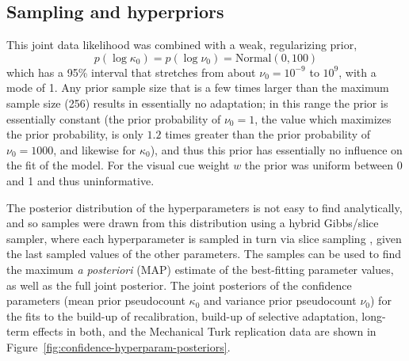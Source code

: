 \subsection{Sampling and hyperpriors}
\label{sec:sampl-hyperp-priors}

This joint data likelihood was combined with a weak, regularizing prior, 
$$p(\log \kappa_0) = p(\log \nu_0) = \mathrm{Normal}(0, 100)$$ 
which has a 95\% interval that stretches from about $\nu_0=10^{-9}$ to $10^{9}$, with a mode of 1.  Any prior sample size that is a few times larger than the maximum sample size (256) results in essentially no adaptation; in this range the prior is essentially constant (the prior probability of $\nu_0 = 1$, the value which maximizes the prior probability, is only $1.2$ times greater than the prior probability of $\nu_0=1000$, and likewise for $\kappa_0$), and thus this prior has essentially no influence on the fit of the model.  For the visual cue weight $w$ the prior was uniform between 0 and 1 and thus uninformative.

The posterior distribution of the hyperparameters is not easy to find analytically, and so samples were drawn from this distribution using a hybrid Gibbs/slice sampler, where each hyperparameter is sampled in turn via slice sampling \autocite{Neal2003}, given the last sampled values of the other parameters.  The samples can be used to find the maximum \emph{a posteriori} (MAP) estimate of the best-fitting parameter values, as well as the full joint posterior.  The joint posteriors of the confidence parameters (mean prior pseudocount $\kappa_0$ and variance prior pseudocount $\nu_0$) for the fits to the build-up of recalibration, build-up of selective adaptation, long-term effects in both, and the Mechanical Turk replication data are shown in Figure~\ref{fig:confidence-hyperparam-posteriors}.

